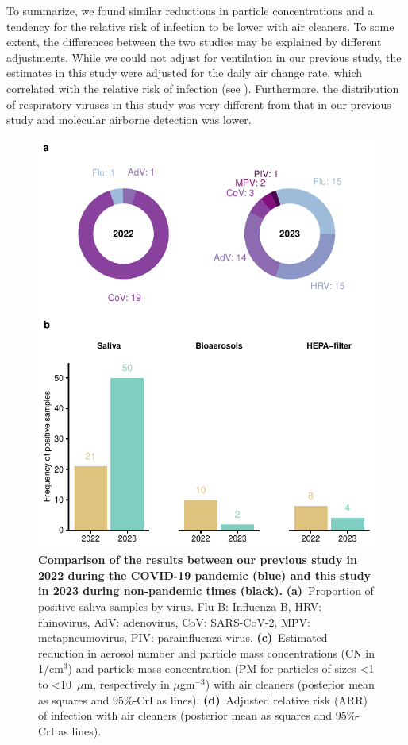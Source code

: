\documentclass[fleqn,11pt]{wlscirep}
\begin{document}

To summarize, we found similar reductions in particle concentrations and a tendency for the relative risk of infection to be lower with air cleaners. To some extent, the differences between the two studies may be explained by different adjustments. While we could not adjust for ventilation in our previous study, the estimates in this study were adjusted for the daily air change rate, which correlated with the relative risk of infection (see ). Furthermore, the distribution of respiratory viruses in this study was very different from that in our previous study and molecular airborne detection was lower.

\begin{figure}[!htpb]
    \includegraphics[width=\linewidth]{../../results/comparison.pdf} 
    \caption{\textbf{Comparison of the results between our previous study in 2022 during the COVID-19 pandemic (blue) and this study in 2023 during non-pandemic times (black).} \textbf{(a)}~Proportion of positive saliva samples by virus. Flu B: Influenza B, HRV: rhinovirus, AdV: adenovirus, CoV: SARS-CoV-2, MPV: metapneumovirus, PIV: parainfluenza virus. \textbf{(c)}~Estimated reduction in aerosol number and particle mass concentrations (CN in 1/cm$^3$) and particle mass concentration (PM for particles of sizes <1 to <10~$\mu$m, respectively in $\mu$gm$^{-3}$) with air cleaners (posterior mean as squares and 95\%-CrI as lines). \textbf{(d)}~Adjusted relative risk (ARR) of infection with air cleaners (posterior mean as squares and 95\%-CrI as lines).}
    \label{fig:comparison}
\end{figure}
\end{document}
